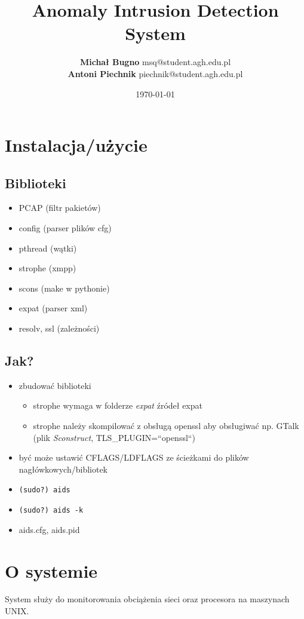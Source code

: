 \documentclass{beamer}
\title{Anomaly Intrusion Detection System}
\author[Michał Bugno \and Antoni Piechnik]
{
  \textbf{Michał Bugno} msq@student.agh.edu.pl \\
  \textbf{Antoni Piechnik} piechnik@student.agh.edu.pl
}
\date{\today}
\begin{document}
\maketitle

\section{Instalacja/użycie}
\subsection{Biblioteki}
\begin{frame}
	\begin{itemize}
	\item PCAP (filtr pakietów)
	\item config (parser plików cfg)
	\item pthread (wątki)
	\item strophe (xmpp)
	\item scons (make w pythonie)
	\item expat (parser xml)
	\item resolv, ssl (zależności)
	\end{itemize}
\end{frame}

\subsection{Jak?}
\begin{frame}
	\begin{itemize}
	\item zbudować biblioteki
	\begin{itemize}
		\item strophe wymaga w folderze \emph{expat} źródeł expat
		\item strophe należy skompilować z obsługą openssl aby obsługiwać np. GTalk (plik \emph{Sconstruct}, TLS\_PLUGIN=``openssl``)
	\end{itemize}
	\item być może ustawić CFLAGS/LDFLAGS ze ścieżkami do plików nagłówkowych/bibliotek
	\end{itemize}
\end{frame}

\begin{frame}
\begin{itemize}
\item \texttt{(sudo?) aids}
\item \texttt{(sudo?) aids -k}
\item aids.cfg, aids.pid
\end{itemize}
\end{frame}

\section{O systemie}
\begin{frame}
System służy do monitorowania obciążenia sieci oraz procesora na maszynach UNIX.
\end{frame}
\end{document}
